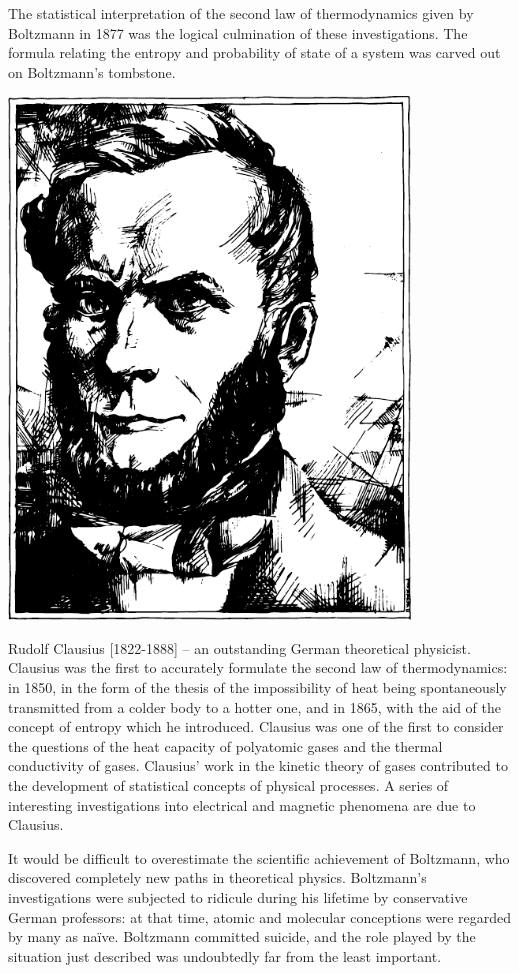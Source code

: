 The statistical interpretation of the second law of ther­modynamics given by Boltzmann in 1877 was the logi­cal culmination of these investigations. The formula relating the entropy and probability of state of a system was carved out on Boltzmann’s tombstone.



\begin{center}
\includegraphics[width=0.8\textwidth,angle=-0.05]{figures/clausius.pdf}
\end{center}
{\small \textsf{{Rudolf Clausius [1822-1888]} -- \textsf{\footnotesize an outstanding German theoretical physicist. Clausius was the first to accurately formulate the second law of thermodynamics: in 1850, in the form of the thesis of the impossibility of heat being spontaneously transmitted from a colder body to a hotter one, and in 1865, with the aid of the concept of entropy which he introduced. Clausius was one of the first to consider the questions of the heat capacity of polyatomic gases and the thermal conductivity of gases. Clausius' work in the kinetic theory of gases contributed to the development of statistical concepts of physical processes. A series of interesting in­vestigations into electrical and magnetic phenomena are due to Clausius.}}}

It would be difficult to overestimate the scientific achievement of Boltzmann, who discovered completely new paths in theoretical physics. Boltzmann’s investigations were subjected to ridicule during his lifetime by conservative German professors: at that time, atomic and molecular conceptions were regarded by many as na\"ive. Boltzmann committed suicide, and the role played by the situation just described was undoubtedly far from the least important.

